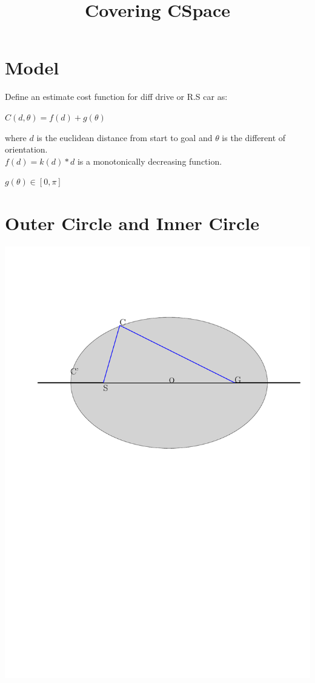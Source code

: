 \documentclass[12pt]{article}
\title{Covering CSpace}
\date{}
\begin{document}
  \maketitle
  \section{Model}
	Define an estimate cost function for diff drive or R.S car as:

  $C( d, \theta ) = f(d) + g(\theta)$

  where $d$ is the euclidean distance from start to goal and $\theta$ is the different of orientation. \\

  $f(d) = k(d) * d$ is a monotonically decreasing function.

  $g(\theta) \in [0, \pi]$

  \section{Outer Circle and Inner Circle}
  \includegraphics[scale=0.7]{Ellipse}\\
\end{document}
